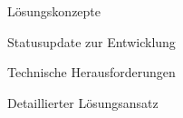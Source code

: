 \begin{frame}{Lösungskonzepte}

\end{frame}

\begin{frame}{Statusupdate zur Entwicklung}

\end{frame}

\begin{frame}{Technische Herausforderungen}

\end{frame}

\begin{frame}{Detaillierter Lösungsansatz}

\end{frame}

%

